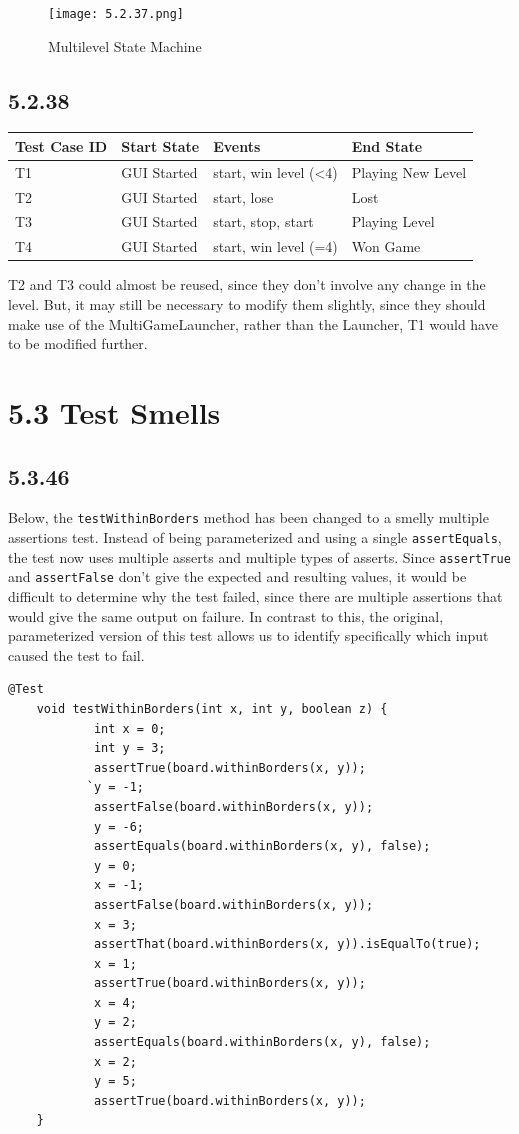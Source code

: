 \documentclass[]{article}
\begin{document}
\begin{figure}
\centering
\texttt{[image: 5.2.37.png]}
\caption{Multilevel State Machine}
\end{figure}

\subsection{5.2.38}\label{section-23}

\begin{longtable}[]{@{}llll@{}}
\toprule
Test Case ID & Start State & Events & End State\tabularnewline
\midrule
\endhead
T1 & GUI Started & start, win level (\textless{}4) & Playing New
Level\tabularnewline
T2 & GUI Started & start, lose & Lost\tabularnewline
T3 & GUI Started & start, stop, start & Playing Level\tabularnewline
T4 & GUI Started & start, win level (=4) & Won Game\tabularnewline
\bottomrule
\end{longtable}

T2 and T3 could almost be reused, since they don't involve any change in
the level. But, it may still be necessary to modify them slightly, since
they should make use of the MultiGameLauncher, rather than the Launcher,
T1 would have to be modified further.

\section{5.3 Test Smells}\label{test-smells}

\subsection{5.3.46}\label{section-24}

Below, the \texttt{testWithinBorders} method has been changed to a
smelly multiple assertions test. Instead of being parameterized and
using a single \texttt{assertEquals}, the test now uses multiple asserts
and multiple types of asserts. Since \texttt{assertTrue} and
\texttt{assertFalse} don't give the expected and resulting values, it
would be difficult to determine why the test failed, since there are
multiple assertions that would give the same output on failure. In
contrast to this, the original, parameterized version of this test
allows us to identify specifically which input caused the test to fail.

\begin{verbatim}
@Test
    void testWithinBorders(int x, int y, boolean z) {
            int x = 0;
            int y = 3;
            assertTrue(board.withinBorders(x, y));
           `y = -1;
            assertFalse(board.withinBorders(x, y));
            y = -6;
            assertEquals(board.withinBorders(x, y), false);
            y = 0;
            x = -1;
            assertFalse(board.withinBorders(x, y));
            x = 3;
            assertThat(board.withinBorders(x, y)).isEqualTo(true);
            x = 1;
            assertTrue(board.withinBorders(x, y));
            x = 4;
            y = 2;
            assertEquals(board.withinBorders(x, y), false);
            x = 2;
            y = 5;
            assertTrue(board.withinBorders(x, y));
    }
\end{verbatim}
\end{document}
